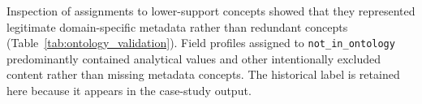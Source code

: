 \documentclass{article}
\begin{document}
\begin{table}[!ht]
    \centering
    \caption{Metadata concepts with the highest and lowest snapshot support.}
    \label{tab:ontology_frequency}
\end{table}

Inspection of assignments to lower-support concepts showed that they represented legitimate domain-specific metadata rather than redundant concepts (Table~\ref{tab:ontology_validation}). Field profiles assigned to \texttt{not\_in\_ontology} predominantly contained analytical values and other intentionally excluded content rather than missing metadata concepts. The historical label is retained here because it appears in the case-study output.
\end{document}
